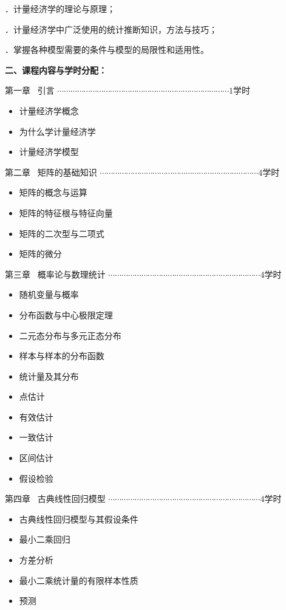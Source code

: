 ．计量经济学的理论与原理；

．计量经济学中广泛使用的统计推断知识，方法与技巧；

．掌握各种模型需要的条件与模型的局限性和适用性。

\noindent \textbf{二、课程内容与学时分配：}

\noindent 第一章 \ 引言
$ \cdots\cdots\cdots\cdots\cdots\cdots\cdots\cdots\cdots\cdots\cdots\cdots\cdots\cdots\cdots
\cdots\cdots\cdots\cdots\cdots\cdots\cdots\cdots\cdots\cdots\cdots \text{1学时} $
\begin{itemize}
	\setlength{\itemsep}{-2pt} 
	\item 计量经济学概念
	\item 为什么学计量经济学
	\item 计量经济学模型 
\end{itemize}	

\noindent 第二章 \ 矩阵的基础知识	
$ \cdots\cdots\cdots\cdots\cdots\cdots\cdots\cdots\cdots\cdots\cdots\cdots\cdots\cdots\cdots
\cdots\cdots\cdots\cdots\cdots\cdots\cdots\cdots\cdots \text{4学时} $
\begin{itemize}
	\setlength{\itemsep}{-2pt}
	\item 矩阵的概念与运算
	\item 矩阵的特征根与特征向量
	\item 矩阵的二次型与二项式
	\item 矩阵的微分
\end{itemize}

\noindent 第三章 \ 概率论与数理统计
$ \cdots\cdots\cdots\cdots\cdots\cdots\cdots\cdots\cdots\cdots\cdots\cdots\cdots\cdots\cdots
\cdots\cdots\cdots\cdots\cdots\cdots\cdots\cdots \text{4学时} $
\begin{itemize}
	\setlength{\itemsep}{-2pt}
	\item 随机变量与概率
	\item 分布函数与中心极限定理 
	\item 二元态分布与多元正态分布
	\item 样本与样本的分布函数
	\item 统计量及其分布
	\item 点估计
	\item 有效估计
	\item 一致估计
	\item 区间估计
	\item 假设检验
\end{itemize}

\noindent 第四章 \ 古典线性回归模型
$ \cdots\cdots\cdots\cdots\cdots\cdots\cdots\cdots\cdots\cdots\cdots\cdots\cdots\cdots\cdots
\cdots\cdots\cdots\cdots\cdots\cdots\cdots\cdots\text{4学时} $
\begin{itemize}
	\setlength{\itemsep}{-2pt}
	\item 古典线性回归模型与其假设条件
	\item 最小二乘回归
	\item 方差分析
	\item 最小二乘统计量的有限样本性质
	\item 预测
\end{itemize}	

